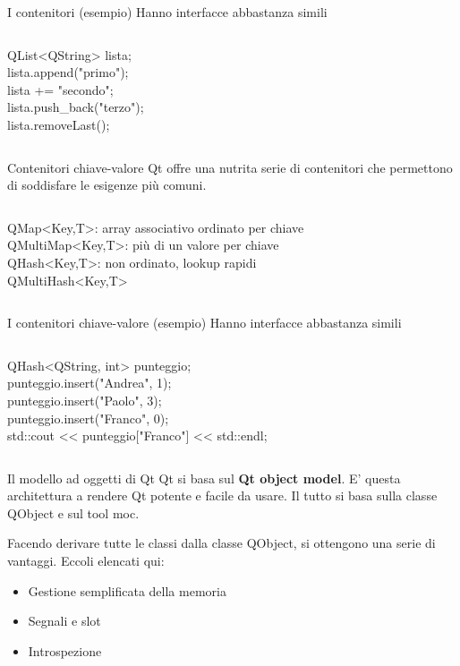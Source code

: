 \documentclass[10pt]{beamer}
\begin{document}
\begin{frame}{I contenitori (esempio)}
	Hanno interfacce abbastanza simili
	\bigskip
	\begin{columns}
		\begin{block}{}
			{\ttfamily QList<QString> lista;\\
				lista.append("primo");\\
				lista += "secondo";\\
				lista.push\_back("terzo");\\
				lista.removeLast();}
		\end{block}
	\end{columns}
	\bigskip
\end{frame}

\begin{frame}{Contenitori chiave-valore}
	Qt offre una nutrita serie di contenitori che permettono di soddisfare le esigenze più comuni.
	\bigskip
	\begin{columns}
		\column{0.8\textwidth}
		\begin{block}{}
			{\ttfamily QMap<Key,T>}: array associativo ordinato per chiave\\
			{\ttfamily QMultiMap<Key,T>}: più di un valore per chiave\\
			{\ttfamily QHash<Key,T>}: non ordinato, lookup rapidi\\
			{\ttfamily QMultiHash<Key,T>}
		\end{block}
	\end{columns}
\end{frame}

\begin{frame}{I contenitori chiave-valore (esempio)}
Hanno interfacce abbastanza simili
\bigskip
\begin{columns}
	\column{0.75\textwidth}
	\begin{block}{}
		{\ttfamily QHash<QString, int> punteggio;\\
			punteggio.insert("Andrea", 1);\\
			punteggio.insert("Paolo", 3);\\
			punteggio.insert("Franco", 0);\\
			std::cout << punteggio["Franco"] << std::endl;}
	\end{block}
\end{columns}
\end{frame}

\begin{frame}{Il modello ad oggetti di Qt}
	Qt si basa sul \textbf{Qt object model}. E' questa architettura a rendere Qt potente e facile da usare. Il tutto si basa sulla classe {\ttfamily QObject} e sul tool {\ttfamily moc}.
	
	Facendo derivare tutte le classi dalla classe {\ttfamily QObject}, si ottengono una serie di vantaggi. Eccoli elencati qui:
	
	\begin{itemize}
		\item Gestione semplificata della memoria
		\item Segnali e slot
		\item Introspezione
	\end{itemize}
\end{frame}
\end{document}
